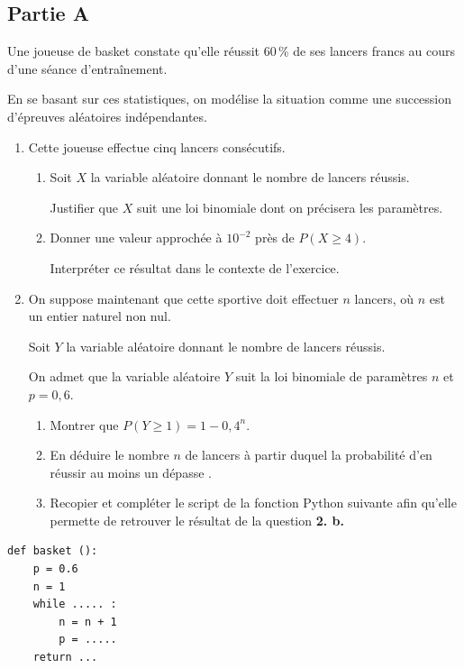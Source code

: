 \subsection*{Partie A}

Une joueuse de basket constate qu'elle réussit 60\,\% de ses lancers francs au cours d'une séance d'entraînement.

En se basant sur ces statistiques, on modélise la situation comme une succession
d'épreuves aléatoires indépendantes.

\medskip

\begin{enumerate}
	\item Cette joueuse effectue cinq lancers consécutifs.
	\begin{enumerate}
		\item Soit $X$ la variable aléatoire donnant le nombre de lancers réussis.

		Justifier que $X$ suit une loi binomiale dont on précisera les paramètres.
		\item Donner une valeur approchée à $10^{-2}$ près de $P(X \geqslant 4)$.

		Interpréter ce résultat dans le contexte de l'exercice.
	\end{enumerate}
	\item On suppose maintenant que cette sportive doit effectuer $n$ lancers, où $n$ est un entier naturel non nul.

	Soit $Y$ la variable aléatoire donnant le nombre de lancers réussis.

	On admet que la variable aléatoire $Y$ suit la loi binomiale de paramètres $n$ et $p = 0,6$.
	\begin{enumerate}
		\item Montrer que $P(Y \geqslant 1)=1 - 0,4^n$.
		\item En déduire le nombre $n$ de lancers à partir duquel la probabilité d'en
		réussir au moins un dépasse .
		\item Recopier et compléter le script de la fonction Python suivante afin qu'elle
		permette de retrouver le résultat de la question \textbf{2. b.}
	\end{enumerate}
\end{enumerate}

\begin{lstlisting}[style=python,xleftmargin=0.3\linewidth,xrightmargin=0.3\linewidth,numbers=none]
def basket ():
	p = 0.6
	n = 1
	while ..... :
		n = n + 1
		p = .....
	return ...
\end{lstlisting}

